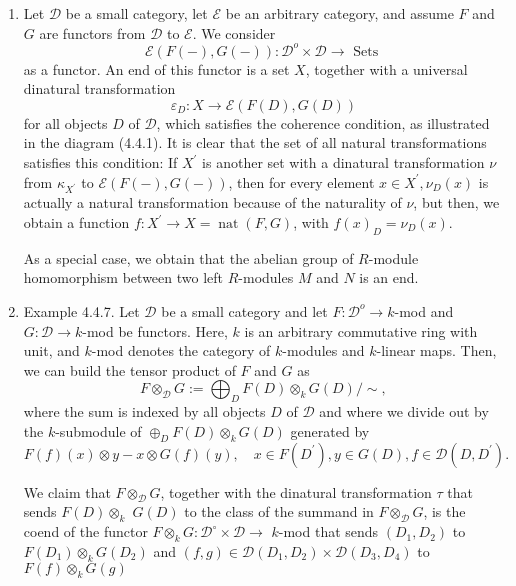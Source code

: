 \begin{example}\begin{enumerate}
    \item Let $\mathcal{D}$ be a small category, let $\mathcal{E}$ be an arbitrary category, and assume $F$ and $G$ are functors from $\mathcal{D}$ to $\mathcal{E}$. We consider
        $$
        \mathcal{E}(F(-), G(-)): \mathcal{D}^o \times \mathcal{D} \rightarrow \text { Sets }
        $$
        as a functor. An end of this functor is a set $X$, together with a universal dinatural transformation
        $$
        \varepsilon_D: X \rightarrow \mathcal{E}(F(D), G(D))
        $$
        for all objects $D$ of $\mathcal{D}$, which satisfies the coherence condition, as illustrated in the diagram (4.4.1). It is clear that the set of all natural transformations satisfies this condition: If $X^{\prime}$ is another set with a dinatural transformation $\nu$ from $\kappa_{X^{\prime}}$ to $\mathcal{E}(F(-), G(-))$, then for every element $x \in X^{\prime}, \nu_D(x)$ is actually a natural transformation because of the naturality of $\nu$, but then, we obtain a function $f: X^{\prime} \rightarrow X=\operatorname{nat}(F, G)$, with $f(x)_D=\nu_D(x)$.
        
        As a special case, we obtain that the abelian group of $R$-module homomorphism between two left $R$-modules $M$ and $N$ is an end.   
        \item Example 4.4.7. Let $\mathcal{D}$ be a small category and let $F: \mathcal{D}^o \rightarrow k$-mod and $G: \mathcal{D} \rightarrow k$-mod be functors. Here, $k$ is an arbitrary commutative ring with unit, and $k$-mod denotes the category of $k$-modules and $k$-linear maps. Then, we can build the tensor product of $F$ and $G$ as
        $$
        F \otimes_{\mathcal{D}} G:=\bigoplus_D F(D) \otimes_k G(D) / \sim,
        $$
        where the sum is indexed by all objects $D$ of $\mathcal{D}$ and where we divide out by the $k$-submodule of $\oplus_D F(D) \otimes_k G(D)$ generated by
        $$
        F(f)(x) \otimes y-x \otimes G(f)(y), \quad x \in F\left(D^{\prime}\right), y \in G(D), f \in \mathcal{D}\left(D, D^{\prime}\right) .
        $$
        
        We claim that $F \otimes_{\mathcal{D}} G$, together with the dinatural transformation $\tau$ that sends $F(D) \otimes_k$ $G(D)$ to the class of the summand in $F \otimes_{\mathcal{D}} G$, is the coend of the functor $F \otimes_k G: \mathcal{D}^{\circ} \times \mathcal{D} \rightarrow$ $k$-mod that sends $\left(D_1, D_2\right)$ to $F\left(D_1\right) \otimes_k G\left(D_2\right)$ and $(f, g) \in \mathcal{D}\left(D_1, D_2\right) \times \mathcal{D}\left(D_3, D_4\right)$ to $F(f) \otimes_k G(g)$
\end{enumerate}
\end{example}

